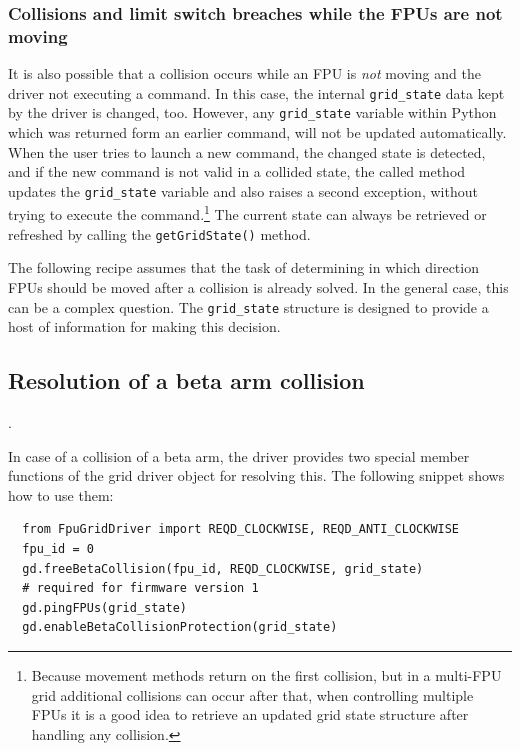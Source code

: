 \documentclass[11pt,a4paper]{scrartcl}
\begin{document}
\subsubsection{Collisions and limit switch breaches while the FPUs are not moving}
 It is also possible that
a collision occurs while an FPU is \emph{not} moving and the driver
not executing a command.  In this case, the internal
\texttt{grid\_state} data kept by the driver is changed, too. However,
any \texttt{grid\_state} variable within Python which was returned
form an earlier command, will not be updated automatically. When the
user tries to launch a new command, the changed state is detected, and
if the new command is not valid in a collided state, the called method
updates the \texttt{grid\_state} variable and also raises a second
exception, without trying to execute the command.\footnote{Because
  movement methods return on the first collision, but in a multi-FPU
  grid additional collisions can occur after that, when controlling
  multiple FPUs it is a good idea to retrieve an updated grid state
  structure after handling any collision.}  The current state can
always be retrieved or refreshed by calling the
\texttt{getGridState()} method.

The following recipe assumes that the task of determining in which
direction FPUs should be moved after a collision is already solved.
In the general case, this can be a complex question. The
\texttt{grid\_state} structure is designed to provide a host of
information for making this decision.

\subsection{Resolution of a beta arm collision}
\label{sec:betacollisionresolution}.

In case of a collision of a beta arm, the driver provides two special
member functions of the grid driver object for resolving this. The
following snippet shows how to use them:

\begin{verbatim}
  from FpuGridDriver import REQD_CLOCKWISE, REQD_ANTI_CLOCKWISE
  fpu_id = 0
  gd.freeBetaCollision(fpu_id, REQD_CLOCKWISE, grid_state)
  # required for firmware version 1
  gd.pingFPUs(grid_state)
  gd.enableBetaCollisionProtection(grid_state)
\end{verbatim}
\end{document}
